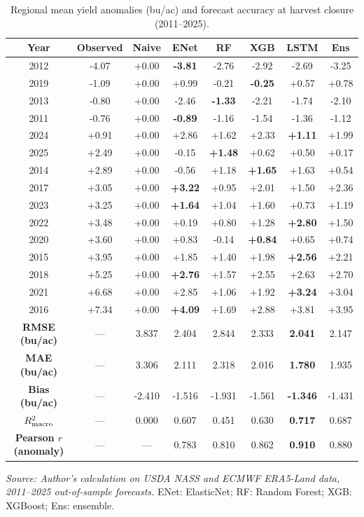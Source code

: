 \begin{table}[htbp]
\centering
\singlespacing
\footnotesize
\setlength{\tabcolsep}{3.2pt}
\renewcommand{\arraystretch}{1.10}
\caption{Regional mean yield anomalies (bu/ac) and forecast accuracy at harvest closure (2011--2025).}
\label{tab:yearly_macro_yields}
\begin{tabular*}{\textwidth}{@{\extracolsep{\fill}}c c c c c c c c @{}}
\toprule
\textbf{Year} & \textbf{Observed} & \textbf{Naive} & \textbf{ENet} & \textbf{RF} & \textbf{XGB} & \textbf{LSTM} & \textbf{Ens} \\
\midrule
2012 & -4.07 & +0.00 & \textbf{-3.81} & -2.76 & -2.92 & -2.69 & -3.25 \\
2019 & -1.09 & +0.00 & +0.99 & -0.21 & \textbf{-0.25} & +0.57 & +0.78 \\
2013 & -0.80 & +0.00 & -2.46 & \textbf{-1.33} & -2.21 & -1.74 & -2.10 \\
2011 & -0.76 & +0.00 & \textbf{-0.89} & -1.16 & -1.54 & -1.36 & -1.12 \\
2024 & +0.91 & +0.00 & +2.86 & +1.62 & +2.33 & \textbf{+1.11} & +1.99 \\
2025 & +2.49 & +0.00 & -0.15 & \textbf{+1.48} & +0.62 & +0.50 & +0.17 \\
2014 & +2.89 & +0.00 & -0.56 & +1.18 & \textbf{+1.65} & +1.63 & +0.54 \\
2017 & +3.05 & +0.00 & \textbf{+3.22} & +0.95 & +2.01 & +1.50 & +2.36 \\
2023 & +3.25 & +0.00 & \textbf{+1.64} & +1.04 & +1.60 & +0.73 & +1.19 \\
2022 & +3.48 & +0.00 & +0.19 & +0.80 & +1.28 & \textbf{+2.80} & +1.50 \\
2020 & +3.60 & +0.00 & +0.83 & -0.14 & \textbf{+0.84} & +0.65 & +0.74 \\
2015 & +3.95 & +0.00 & +1.85 & +1.40 & +1.98 & \textbf{+2.56} & +2.21 \\
2018 & +5.25 & +0.00 & \textbf{+2.76} & +1.57 & +2.55 & +2.63 & +2.70 \\
2021 & +6.68 & +0.00 & +2.85 & +1.06 & +1.92 & \textbf{+3.24} & +3.04 \\
2016 & +7.34 & +0.00 & \textbf{+4.09} & +1.69 & +2.88 & +3.81 & +3.95 \\
\midrule
\textbf{RMSE (bu/ac)} & --- & 3.837 & 2.404 & 2.844 & 2.333 & \textbf{2.041} & 2.147 \\
\textbf{MAE (bu/ac)} & --- & 3.306 & 2.111 & 2.318 & 2.016 & \textbf{1.780} & 1.935 \\
\textbf{Bias (bu/ac)} & --- & -2.410 & -1.516 & -1.931 & -1.561 & \textbf{-1.346} & -1.431 \\
\textbf{$R^2_{\rm macro}$} & --- & 0.000 & 0.607 & 0.451 & 0.630 & \textbf{0.717} & 0.687 \\
\textbf{Pearson $r$ (anomaly)} & --- & --- & 0.783 & 0.810 & 0.862 & \textbf{0.910} & 0.880 \\
\bottomrule
\end{tabular*}
\vspace{0.2em}
{\footnotesize\textit{Source: Author's calculation on USDA NASS and ECMWF ERA5-Land data, 2011--2025 out-of-sample forecasts.} ENet: ElasticNet; RF: Random Forest; XGB: XGBoost; Ens: ensemble.}
\end{table}
